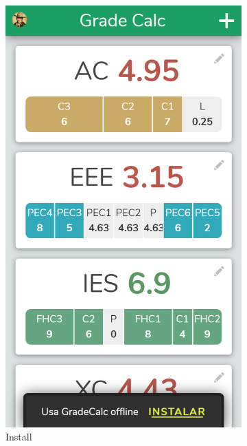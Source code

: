 \begin{figure}[ht!]
\begin{subfigure}[b]{0.25\textwidth-0.1cm}
        \includegraphics[width=\textwidth]{media/screenshots/screenshot-notification-install.png}
        \caption{Install}
    \end{subfigure}
    \hfill
    \begin{subfigure}[b]{0.25\textwidth-0.1cm}
        \centering

\end{subfigure}
\end{figure}
